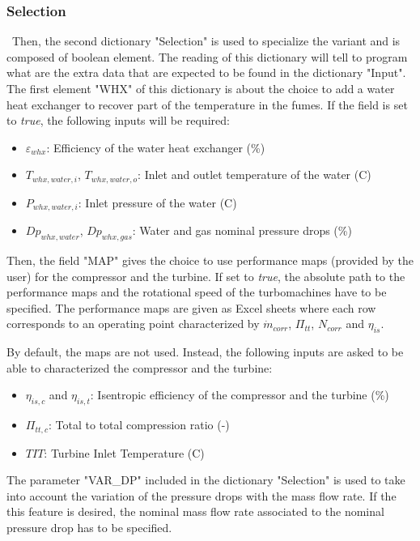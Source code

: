 \subsubsection{Selection}
\quad\ Then, the second dictionary "Selection" is used to specialize the variant and is composed of boolean element. The reading of this dictionary will tell to program what are the extra data that are expected to be found in the dictionary "Input".
\newpage
The first element "WHX" of this dictionary is about the choice to add a water heat exchanger to recover part of the temperature in the fumes. If the field is set to \textit{true}, the following inputs will be required:
\begin{itemize}
    \item $\varepsilon_{whx}$: Efficiency of the water heat exchanger (\%)
    \item $T_{whx,water,i}$, $T_{whx,water,o}$: Inlet and outlet temperature of the water (\degree C)
    \item $P_{whx,water, i}$: Inlet pressure of the water (\degree C)
    \item $Dp_{whx,water}$, $Dp_{whx,gas}$: Water and gas nominal pressure drops (\%)
\end{itemize}

Then, the field "MAP" gives the choice to use performance maps (provided by the user) for the compressor and the turbine. If set to \textit{true}, the absolute path to the performance maps and the rotational speed of the turbomachines have to be specified. The performance maps are given as Excel sheets where each row corresponds to an operating point characterized by \(\dot{m}_{corr}\), \(\Pi_{tt}\), \(N_{corr}\) and \(\eta_{is}\).

By default, the maps are not used. Instead, the following inputs are asked to be able to characterized the compressor and the turbine:

\begin{itemize}
    \item $\eta_{is,c}$ and $\eta_{is,t}$: Isentropic efficiency of the compressor and the turbine (\%)
    \item $\Pi_{tt,c}$: Total to total compression ratio (-)
    \item $TIT$: Turbine Inlet Temperature (\degree C)
\end{itemize}

The parameter "VAR\_DP" included in the dictionary "Selection" is used to take into account the variation of the pressure drops with the mass flow rate. If the this feature is desired, the nominal mass flow rate associated to the nominal pressure drop has to be specified.  

